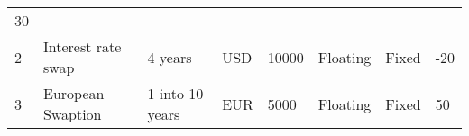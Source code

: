 \begin{longtable}[]{@{}llllllll@{}}
\begin{minipage}[t]{0.13\columnwidth}
30\strut
\end{minipage}\tabularnewline
\begin{minipage}[t]{0.04\columnwidth}\raggedright
2\strut
\end{minipage} & \begin{minipage}[t]{0.10\columnwidth}\raggedright
Interest rate swap\strut
\end{minipage} & \begin{minipage}[t]{0.09\columnwidth}\raggedright
4 years\strut
\end{minipage} & \begin{minipage}[t]{0.07\columnwidth}\raggedright
USD\strut
\end{minipage} & \begin{minipage}[t]{0.11\columnwidth}\raggedright
10000\strut
\end{minipage} & \begin{minipage}[t]{0.11\columnwidth}\raggedright
Floating\strut
\end{minipage} & \begin{minipage}[t]{0.13\columnwidth}\raggedright
Fixed\strut
\end{minipage} & \begin{minipage}[t]{0.13\columnwidth}\raggedright
-20\strut
\end{minipage}\tabularnewline
\begin{minipage}[t]{0.04\columnwidth}\raggedright
3\strut
\end{minipage} & \begin{minipage}[t]{0.10\columnwidth}\raggedright
European Swaption\strut
\end{minipage} & \begin{minipage}[t]{0.09\columnwidth}\raggedright
1 into 10 years\strut
\end{minipage} & \begin{minipage}[t]{0.07\columnwidth}\raggedright
EUR\strut
\end{minipage} & \begin{minipage}[t]{0.11\columnwidth}\raggedright
5000\strut
\end{minipage} & \begin{minipage}[t]{0.11\columnwidth}\raggedright
Floating\strut
\end{minipage} & \begin{minipage}[t]{0.13\columnwidth}\raggedright
Fixed\strut
\end{minipage} & \begin{minipage}[t]{0.13\columnwidth}\raggedright
50\strut
\end{minipage}\tabularnewline
\bottomrule
\end{longtable}

